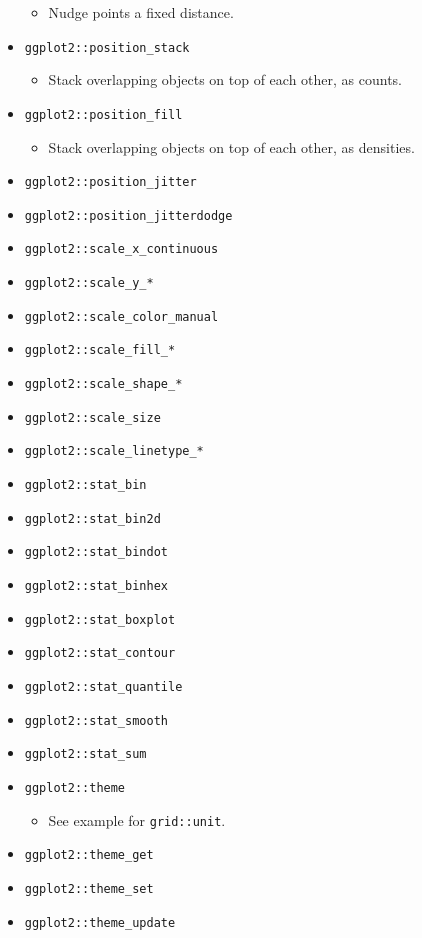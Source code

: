 \documentclass[
]{book}
\providecommand{\tightlist}{%
  \setlength{\itemsep}{0pt}\setlength{\parskip}{0pt}}
\begin{document}
\begin{itemize}
  \begin{itemize}
  \tightlist
  \item
    Nudge points a fixed distance.
  \end{itemize}
\item
  \texttt{ggplot2::position\_stack}

  \begin{itemize}
  \tightlist
  \item
    Stack overlapping objects on top of each other, as counts.
  \end{itemize}
\item
  \texttt{ggplot2::position\_fill}

  \begin{itemize}
  \tightlist
  \item
    Stack overlapping objects on top of each other, as densities.
  \end{itemize}
\item
  \texttt{ggplot2::position\_jitter}
\item
  \texttt{ggplot2::position\_jitterdodge}
\item
  \texttt{ggplot2::scale\_x\_continuous}
\item
  \texttt{ggplot2::scale\_y\_*}
\item
  \texttt{ggplot2::scale\_color\_manual}
\item
  \texttt{ggplot2::scale\_fill\_*}
\item
  \texttt{ggplot2::scale\_shape\_*}
\item
  \texttt{ggplot2::scale\_size}
\item
  \texttt{ggplot2::scale\_linetype\_*}
\item
  \texttt{ggplot2::stat\_bin}
\item
  \texttt{ggplot2::stat\_bin2d}
\item
  \texttt{ggplot2::stat\_bindot}
\item
  \texttt{ggplot2::stat\_binhex}
\item
  \texttt{ggplot2::stat\_boxplot}
\item
  \texttt{ggplot2::stat\_contour}
\item
  \texttt{ggplot2::stat\_quantile}
\item
  \texttt{ggplot2::stat\_smooth}
\item
  \texttt{ggplot2::stat\_sum}
\item
  \texttt{ggplot2::theme}

  \begin{itemize}
  \tightlist
  \item
    See example for \texttt{grid::unit}.
  \end{itemize}
\item
  \texttt{ggplot2::theme\_get}
\item
  \texttt{ggplot2::theme\_set}
\item
  \texttt{ggplot2::theme\_update}


\end{itemize}
\end{document}
